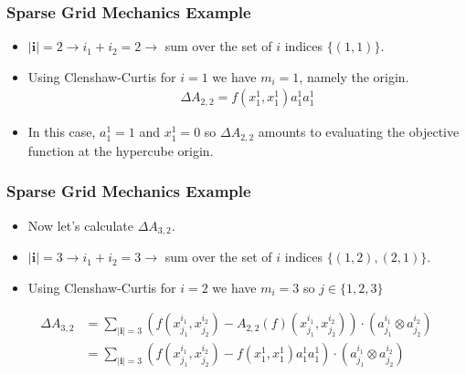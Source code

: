 \documentclass{beamer}
\begin{document}
\begin{frame}
\frametitle{Sparse Grid Mechanics Example}

\begin{itemize}
  \item $\vert\textbf{i}\vert=2 \rightarrow i_1 + i_2 = 2 \rightarrow$ sum over the set of $i$ indices $\lbrace (1, 1)\rbrace$.
  \item Using Clenshaw-Curtis for $i=1$ we have $m_i=1$, namely the origin. 
\begin{align*}
 \Delta A_{2,2} = f\left( x_{1}^{1},x_{1}^{1}\right)a_{1}^{1}a_{1}^{1}
\end{align*}
  \item In this case, $a_1^1 = 1$ and $x_1^1=0$ so $\Delta A_{2,2}$ amounts to evaluating the objective function at the hypercube origin. 
\end{itemize}

\end{frame}
\begin{frame}
\frametitle{Sparse Grid Mechanics Example}

\begin{itemize}
  \item Now let's calculate $\Delta A_{3,2}$. 
  \item $\vert\textbf{i}\vert=3 \rightarrow i_1 + i_2 = 3 \rightarrow$ sum over the set of $i$ indices $\lbrace (1, 2), (2, 1) \rbrace$.
  \item Using Clenshaw-Curtis for $i=2$ we have $m_i=3$ so $j\in \lbrace 1,2,3\rbrace$
\end{itemize}

\begin{align*}
 \Delta A_{3,2} &= \sum_{\vert\textbf{i}\vert=3}
  \left(f(x_{j_1}^{i_1},x_{j_2}^{i_2}) - 
  A_{2,2}(f)(x_{j_1}^{i_1}, x_{j_2}^{i_2})\right)\cdot
  \left(a_{j_1}^{i_1}\otimes a_{j_2}^{i_2}\right) \\ 
 &= \sum_{\vert\textbf{i}\vert=3}
  \left(f(x_{j_1}^{i_1},x_{j_2}^{i_2}) - 
  f\left( x_{1}^{1},x_{1}^{1}\right)a_{1}^{1}a_{1}^{1}\right)\cdot
  \left(a_{j_1}^{i_1}\otimes a_{j_2}^{i_2}\right)
\end{align*}

\end{frame}
\end{document}
